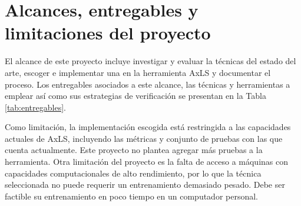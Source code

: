 \section{Alcances, entregables y limitaciones del proyecto}

El alcance de este proyecto incluye investigar y evaluar la técnicas del estado
del arte, escoger e implementar una en la herramienta AxLS y documentar el
proceso. Los entregables asociados a este alcance, las técnicas y herramientas a emplear así
como sus estrategias de verificación se presentan en la Tabla \ref{tab:entregables}.

Como limitación, la implementación escogida está restringida a las capacidades
actuales de AxLS, incluyendo las métricas y conjunto de pruebas con las que
cuenta actualmente. Este proyecto no plantea agregar más pruebas a la
herramienta.
Otra limitación del proyecto es la falta de acceso a máquinas con capacidades
computacionales de alto rendimiento, por lo que la técnica seleccionada no
puede requerir un entrenamiento demasiado pesado. Debe ser factible su
entrenamiento en poco tiempo en un computador personal.

